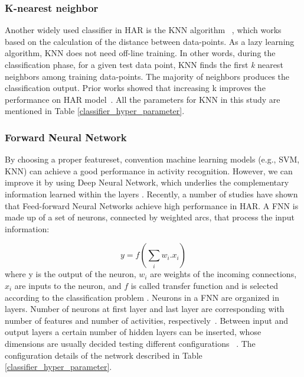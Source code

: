 \documentclass[journal,article,submit,moreauthors,pdftex]{Definitions/mdpi}
\begin{document}
\subsubsection{K-nearest neighbor}
Another widely used classifier in HAR is the KNN algorithm ~\cite{wang2019survey,shakya2018comparative}, which works based on the calculation of the distance between data-points. As a lazy learning algorithm, KNN does not need off-line training. In other words, during the classification phase, for a given test data point, KNN finds the first \textit{k} nearest neighbors among training data-points. The majority of neighbors produces the classification output. Prior works showed that increasing k improves the performance on HAR model~\cite{kose2012online}. All the parameters for KNN in this study are mentioned in Table \ref{classifier_hyper_parameter}.

\subsubsection{Forward Neural Network}
By choosing a proper featureset, convention machine learning models (e.g., SVM, KNN) can achieve a good performance in activity recognition. However, we can improve it by using Deep Neural Network, which underlies the complementary information learned within the layers \cite{chen2018distilling}.
Recently, a number of studies have shown that Feed-forward Neural Networks achieve high performance in HAR\cite{chen2018distilling, zhu2009human}. A FNN is made up of a set of neurons, connected by weighted arcs, that process the input information:

\begin{equation}
\label{fnn_formula}
 y = f(\sum_{i}^{}w_{i}.x_{i})
\end{equation}
where y is the output of the neuron, $ w_{i} $ are weights of the incoming connections, $ x_i $ are inputs to the neuron, and $f$ is called transfer function and is selected according to the classification problem \cite{zhang1999geometrical}. Neurons in a FNN are organized in layers. Number of neurons at first layer and last layer are corresponding with number of features and number of activities, respectively~\cite{baldominos2019comparison}. Between input and output layers a certain number of hidden layers can be inserted, whose dimensions are usually decided testing different configurations ~\cite{baldominos2019comparison}. The configuration details of the network described in Table \ref{classifier_hyper_parameter}.
\end{document}
